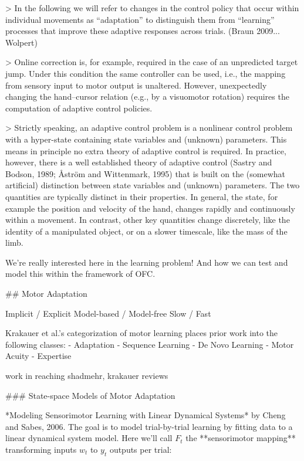 \documentclass[../main.tex]{subfiles}
\begin{document}
{{{> In the following we will refer to changes in the control policy that occur within individual movements as “adaptation” to distinguish them from “learning” processes that improve these adaptive responses across trials. (Braun 2009... Wolpert)

> Online correction is, for example, required in the case of an unpredicted target jump. Under this condition the same controller can be used, i.e., the mapping from sensory input to motor output is unaltered. However, unexpectedly changing the hand–cursor relation (e.g., by a visuomotor rotation) requires the computation of adaptive control policies. 

> Strictly speaking, an adaptive control problem is a nonlinear control problem with a hyper-state containing state variables and (unknown) parameters. This means in principle no extra theory of adaptive control is required. In practice, however, there is a well established theory of adaptive control (Sastry and Bodson, 1989; Åström and Wittenmark, 1995) that is built on the (somewhat artificial) distinction between state variables and (unknown) parameters. The two quantities are typically distinct in their properties. In general, the state, for example the position and velocity of the hand, changes rapidly and continuously within a movement. In contrast, other key quantities change discretely, like the identity of a manipulated object, or on a slower timescale, like the mass of the limb.

We're really interested here in the learning problem! And how we can test and model this within the framework of OFC.


## Motor Adaptation

Implicit / Explicit
Model-based / Model-free
Slow / Fast

Krakauer et al.'s categorization of motor learning places prior work into the following classes:
- Adaptation
- Sequence Learning
- De Novo Learning
- Motor Acuity
- Expertise

work in reaching
shadmehr, krakauer reviews



### State-space Models of Motor Adaptation

*Modeling Sensorimotor Learning with Linear Dynamical Systems* by Cheng and Sabes, 2006. The goal is to model trial-by-trial learning by fitting data to a linear dynamical system model. Here we'll call $F_t$ the **sensorimotor mapping** transforming inputs $w_t$ to $y_t$ outputs per trial:

}}}
\end{document}
